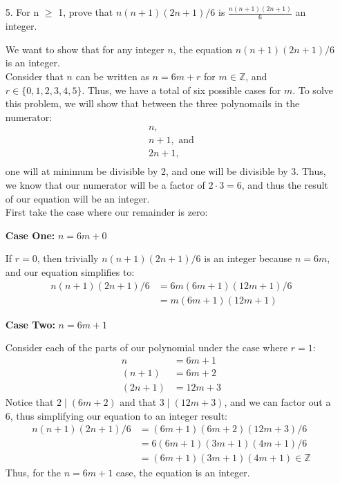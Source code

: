 \documentclass[10pt,oneside]{book}
\newcommand{\Z}{\mathbb{Z}}\newcommand{\R}{\mathbb{R}}\newcommand{\N}{\mathbb{N}}
\newcommand{\n}{\vspace{0.15cm}\\}
\newcommand{\en}{\vspace{0.25cm}\\}
\newcommand{\centerit}[1]{{\begin{center} #1 \end{center}}}
\let\endoldproof\endproof
\renewenvironment{proof}[1][\proofname]
  {\vspace{0.2cm}\begin{adjustwidth}{2em}{2em}
   \oldproof[#1]}
  {\endoldproof
   \end{adjustwidth}}
\begin{document}
\begin{enumerate}
\begin{enumerate}
\begin{proof}
			\begin{align*}
				n^3 &= 27 m^3+ 54 m^2 + 36 m + 8\\
				&= 9(3m^2 + 6m^2 + 4m) + 8\\
			\end{align*}
			Let $k\equiv 3m^2 + 6m^2 + 4m$. We then have that $n^2 = 3k + 2$. Thus, \textbf{Case 3} holds.\en
			Hence, because all three cases hold, $n^3$ can always be written as $n = 9k$, $n = 9k+1$, $n = 9k+8$, for $k\in \Z$. 
		\end{proof}
	\end{enumerate}
	\item [5.] For n $\ge$ 1, prove that $n(n + 1)(2n + 1)/6$ is $\frac{n(n + 1)(2n + 1)}6$ an integer.\n
	\begin{proof}
		We want to show that for any integer $n$, the equation $n(n + 1)(2n + 1)/6$ is an integer.\en
		Consider that $n$ can be written as $n = 6m + r$ for $m\in \Z$, and $r\in\{0,1,2,3,4,5\}$. Thus, we have a total of six possible cases for $m$. To solve this problem, we will show that between the three polynomails in the numerator:
		\begin{gather*}
			n,\\
			n+1, \text{ and}\\
			2n+1,\\
		\end{gather*}
		one will at minimum be divisible by 2, and one will be divisible by 3. Thus, we know that our numerator will be a factor of $2\cdot 3 = 6$, and thus the result of our equation will be an integer. \n
		First take the case where our remainder is zero:
		\centerit{\textbf{Case One: }$n = 6m + 0$}

		If $r = 0$, then trivially $n(n + 1)(2n + 1)/6$ is an integer because $n = 6m$, and our equation simplifies to:
		\begin{align*}
			n(n+1)(2n+1)/6 &= 6m(6m +1)(12m+1)/6\\
			&= m(6m+1)(12m+1)
		\end{align*}
		\pagebreak
		\centerit{\textbf{Case Two: }$n = 6m + 1$}
		Consider each of the parts of our polynomial under the case where $r = 1$:
		\begin{align*}
			n &= 6m +1\\
			(n+1)&= 6m+2\\
			(2n+1)&= 12m+3
		\end{align*}
		Notice that $2\mid (6m+2)$ and that $3\mid (12m+3)$, and we can factor out a 6, thus simplifying our equation to an integer result:
		\begin{align*}
			n(n+1)(2n+1)/6 &= (6m+1)(6m+2)(12m+3)/6\\
			&= 6(6m+1)(3m+1)(4m+1)/6\\
			&= (6m+1)(3m+1)(4m+1) \in \Z
		\end{align*}
		Thus, for the $n= 6m+1$ case, the equation is an integer. 


\end{proof}
\end{enumerate}
\end{document}
